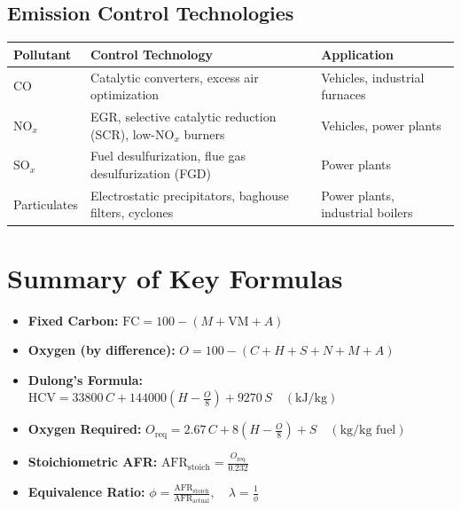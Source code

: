 \documentclass[12pt,a4paper]{article}
\begin{document}
\subsection{Emission Control Technologies}
\begin{center}
\renewcommand{\arraystretch}{1.4}
\begin{tabular}{|l|p{6.5cm}|l|}
\hline
\textbf{Pollutant} & \textbf{Control Technology} & \textbf{Application} \\
\hline
CO & Catalytic converters, excess air optimization & Vehicles, industrial furnaces \\
$\text{NO}_x$ & EGR, selective catalytic reduction (SCR), low-$\text{NO}_x$ burners & Vehicles, power plants \\
$\text{SO}_x$ & Fuel desulfurization, flue gas desulfurization (FGD) & Power plants \\
Particulates & Electrostatic precipitators, baghouse filters, cyclones & Power plants, industrial boilers \\
\hline
\end{tabular}
\end{center}

\section{Summary of Key Formulas}

\begin{itemize}
    \item \textbf{Fixed Carbon:} $\text{FC} = 100 - (M + \text{VM} + A)$
    \item \textbf{Oxygen (by difference):} $O = 100 - (C + H + S + N + M + A)$
    \item \textbf{Dulong's Formula:} $\mathrm{HCV} = 33800\,C + 144000\left(H - \frac{O}{8}\right) + 9270\,S \quad (\text{kJ/kg})$
    \item \textbf{Oxygen Required:} $O_{\mathrm{req}} = 2.67\,C + 8\left(H - \frac{O}{8}\right) + S \quad (\text{kg/kg fuel})$
    \item \textbf{Stoichiometric AFR:} $\text{AFR}_{\mathrm{stoich}} = \frac{O_{\mathrm{req}}}{0.232}$
    \item \textbf{Equivalence Ratio:} $\phi = \frac{\text{AFR}_{\mathrm{stoich}}}{\text{AFR}_{\mathrm{actual}}}, \quad \lambda = \frac{1}{\phi}$
\end{itemize}
\end{document}

